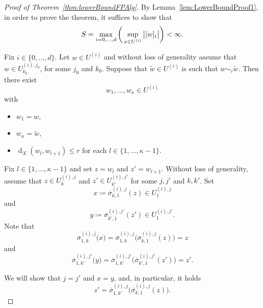 \documentclass[10pt,a4paper]{amsart}
\DeclareMathOperator{\dist}{d}
\newcommand{\distX}[2]{{\dist_X ( #1, #2 )}}
\newcommand{\prn}[1]{{(#1)}}
\begin{document}
    \begin{proof}[Proof of Theorem~\ref{thm:lowerBoundFPAlg}]
    By Lemma~\ref{lem:LowerBoundProof1}, in order to prove the theorem, it suffices to show that 
     \begin{equation*}
        S = \max_{i=0,\hdots,d} \bigg(\sup_{x \in U^{(i)}} \big{\lvert}{ [ w ]_{i}} \big{\rvert} \bigg) < \infty .
    \end{equation*}

        Fix ${i \in \{0,\hdots, d\}}$.
      Let ${w \in U^{\prn{i}}}$ and without loss of generality assume that ${w \in U^{(i),j_0}_{k_0}}$,
      for some ${j_0}$ and ${k_0}$. 
        Suppose that ${\widetilde{w} \in U^{\prn{i}}}$ is such that ${w \sim_i \widetilde{w}}$. 
        Then there exist 
        \[{w_1, \hdots, w_\kappa \in U^{\prn{i}}}\]
        with 
    \begin{itemize}
        \item $w_1 = w,$
        \item $w_\kappa = \widetilde{w},$
        \item ${\distX{w_l}{w_{l+1}} \le r}$ for each ${l \in \{1,\hdots,\kappa-1\}}$.
    \end{itemize}

    Fix ${l \in \{1,\hdots,\kappa-1\}}$ and set 
    ${z=w_l}$ and ${z'=w_{l+1}}$. 
    Without loss of generality, assume that
    ${z \in U^{(i),j}_k}$ and ${z' \in U^{(i),j'}_{k'}}$ for some  ${j, j'}$ and ${k, k'}$. 
        Set 
        \begin{equation*}
            x \coloneq {{\overline{\sigma}}_{k,1}^{(i),j}}(z)  \in U^{(i),j}_1 
        \end{equation*}
        and
        \begin{equation*}
        y \coloneq {\overline{\sigma}_{k',1}^{(i),j'}}(z')  \in U^{(i),j'}_1.
        \end{equation*}
       Note that
        \[{{\overline{\sigma}}_{1,k}^{(i),j}} \big(x \big) = {{\overline{\sigma}}_{1,k}^{(i),j}} \big({{\overline{\sigma}}_{k,1}^{(i),j}}(z) \big) = z\]
        and
        \[{\overline{\sigma}_{1,k'}^{(i),j'}}\big(y \big) = {\overline{\sigma}_{1,k'}^{(i),j'}}\big({\overline{\sigma}_{k',1}^{(i),j'}}(z') \big)
        = z'. \]
        
        We will show that 
        $j = j'$ and $x=y$, and, in particular, it holds
        \begin{equation*}
            z' = {\overline{\sigma}_{1,k'}^{(i),j}}\big({{\overline{\sigma}}_{k,1}^{(i),j}}(z) \big).
        \end{equation*}


\end{proof}
\end{document}
